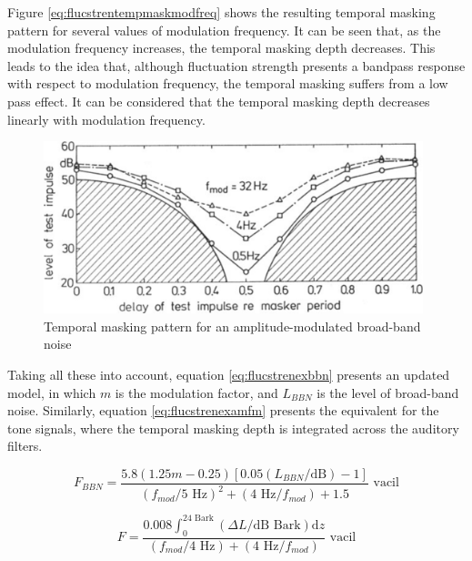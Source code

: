 Figure \ref{eq:flucstrentempmaskmodfreq} shows the resulting temporal masking
pattern for several values of modulation frequency. It can be seen that, as the
modulation frequency increases, the temporal masking depth decreases. This leads
to the idea that, although fluctuation strength presents a bandpass response
with respect to modulation frequency, the temporal masking suffers from a
low pass effect. It can be considered that the temporal masking depth decreases
linearly with modulation frequency.

\begin{figure}
    \centering
    \includegraphics[height=5cm]
        {img/Fastl2007-FluctuationStrengthTemporalMasking}
    \caption{Temporal masking pattern for an amplitude-modulated broad-band
        noise \cite[pp. 255]{Fastl2007Psychoacoustics}}
    \label{fig:flucstrenmasking}
\end{figure}

Taking all these into account, equation \ref{eq:flucstrenexbbn} presents an
updated model, in which $m$ is the modulation factor, and $L_{BBN}$ is the level
of broad-band noise. Similarly, equation \ref{eq:flucstrenexamfm} presents the
equivalent for the tone signals, where the temporal masking depth is integrated
across the auditory filters.

\begin{equation}
    F_{BBN} = \frac{5.8(1.25m-0.25)[0.05(L_{BBN}/\text{dB})-1]}
        {(f_{mod}/5\text{ Hz})^2+(4\text{ Hz}/f_{mod})+1.5} \text{ vacil}
    \label{eq:flucstrenexbbn}
\end{equation}

\begin{equation}
    F = \frac{0.008 \int_0^{24\text{ Bark}}(\Delta L/\text{dB Bark})\mathrm{d}z}
        {(f_{mod}/4\text{ Hz})+(4\text{ Hz}/f_{mod})} \text{ vacil}
    \label{eq:flucstrenexamfm}
\end{equation}
